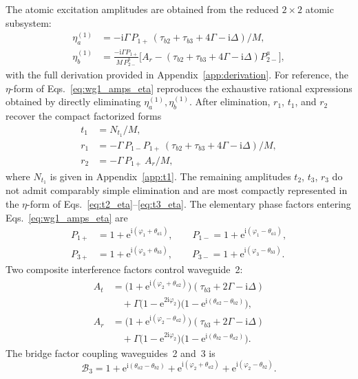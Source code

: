 \documentclass[aps,pra,reprint,superscriptaddress,nofootinbib,longbibliography,floatfix]{revtex4-2}
\newcommand{\ii}{\mathrm{i}}
\newcommand{\ee}{\mathrm{e}}
\newcommand{\Del}{\Delta}
\newcommand{\Gam}{\Gamma}
\newcommand{\ph}{\varphi}
\newcommand{\thaone}{\theta_{a1}}
\newcommand{\thatwo}{\theta_{a2}}
\newcommand{\thbtwo}{\theta_{b2}}
\newcommand{\thbthree}{\theta_{b3}}
\newcommand{\Bthree}{\mathcal{B}_3}
\newcommand{\Poneplus}{P_{1+}}
\newcommand{\Poneminus}{P_{1-}}
\newcommand{\Pthreeplus}{P_{3+}}
\newcommand{\Pthreeminus}{P_{3-}}
\begin{document}
The atomic excitation amplitudes are obtained from the reduced $2\times2$ atomic subsystem:
\begin{subequations}
\label{eq:eta_wg1}
\begin{align}
\eta_a^{(1)} &= -\ii\Gam\,\Poneplus\,(\tau_{b2}+\tau_{b3}+4\Gam-\ii\Del)/M,\\[2pt]
\eta_b^{(1)} &= \frac{-\ii\Gam\Poneplus}{M\,P_{2-}^b}
\bigl[A_r - (\tau_{b2}+\tau_{b3}+4\Gam-\ii\Del)P_{2-}^a\bigr],
\end{align}
\end{subequations}
with the full derivation provided in Appendix~\ref{app:derivation}.
For reference, the $\eta$-form of Eqs.~\eqref{eq:wg1_amps_eta} reproduces the exhaustive rational expressions obtained by directly eliminating $\eta_a^{(1)},\eta_b^{(1)}$. After elimination, $r_1$, $t_1$, and $r_2$ recover the compact factorized forms
\begin{subequations}
\label{eq:wg1_factorized}
\begin{align}
t_1 &= N_{t_1}/M, \label{eq:t1_fact}\\[2pt]
r_1 &= -\Gam\,\Poneminus\Poneplus\,(\tau_{b2}+\tau_{b3}+4\Gam-\ii\Del)/M, \label{eq:r1_fact}\\[2pt]
r_2 &= -\Gam\,\Poneplus\,A_r/M, \label{eq:r2_fact}
\end{align}
\end{subequations}
where $N_{t_1}$ is given in Appendix~\ref{app:t1}. The remaining amplitudes $t_2$, $t_3$, $r_3$ do not admit comparably simple elimination and are most compactly represented in the $\eta$-form of Eqs.~\eqref{eq:t2_eta}--\eqref{eq:t3_eta}.
The elementary phase factors entering Eqs.~\eqref{eq:wg1_amps_eta} are
\begin{subequations}
\label{eq:P}
\begin{align}
\Poneplus &= 1 + \ee^{\ii(\ph_1+\thaone)}, \qquad
\Poneminus = 1 + \ee^{\ii(\ph_1-\thaone)},\\
\Pthreeplus &= 1 + \ee^{\ii(\ph_3+\thbthree)}, \qquad
\Pthreeminus = 1 + \ee^{\ii(\ph_3-\thbthree)}.
\end{align}
\end{subequations}
Two composite interference factors control waveguide~2:
\begin{subequations}
\label{eq:AtAr}
\begin{align}
A_t &= \bigl(1+\ee^{\ii(\ph_2+\thatwo)}\bigr)(\tau_{b3}+2\Gam-\ii\Del) \nonumber\\
&\quad + \Gam\bigl(1-\ee^{2\ii\ph_2}\bigr)
        \bigl(1-\ee^{\ii(\thatwo-\thbtwo)}\bigr),\\
A_r &= \bigl(1+\ee^{\ii(\ph_2-\thatwo)}\bigr)(\tau_{b3}+2\Gam-\ii\Del) \nonumber\\
&\quad + \Gam\bigl(1-\ee^{2\ii\ph_2}\bigr)
        \bigl(1-\ee^{\ii(\thbtwo-\thatwo)}\bigr).
\end{align}
\end{subequations}
The bridge factor coupling waveguides~2 and~3 is
\begin{equation}
\Bthree = 1 + \ee^{\ii(\thatwo-\thbtwo)}
+ \ee^{\ii(\ph_2+\thatwo)} + \ee^{\ii(\ph_2-\thbtwo)}.
\label{eq:B3}
\end{equation}
\end{document}
